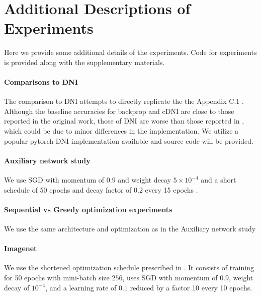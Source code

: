 \documentclass{article}
\begin{document}
\setcounter{section}{1}
\section{Additional Descriptions of Experiments}
Here we provide some additional details of the experiments. Code for experiments is provided along with the supplementary materials.
\paragraph{Comparisons to DNI} The comparison to DNI attempts to directly replicate the the Appendix C.1 \citep{jaderberg2016decoupled}. Although the baseline accuracies for backprop and cDNI are close to those reported in the original work, those of DNI are worse than those reported in \citep{jaderberg2016decoupled}, which could be due to minor differences in the implementation. We utilize a popular pytorch DNI implementation available and source code will be provided.

\paragraph{Auxiliary network study} We use SGD with momentum of $0.9$ and weight decay $5\times 10^{-4}$  \citep{zagoruyko2016wide} and a short schedule of 50 epochs and decay factor of $0.2$ every 15 epochs \citep{shallow}. 
\paragraph{Sequential vs Greedy optimization experiments} We use the same architecture and optimization as in the Auxiliary network study

\paragraph{Imagenet} We use the shortened optimization schedule prescribed in \citep{Xiao2019}. It consists of training for 50 epochs with mini-batch size $256$, uses SGD with momentum of 0.9,  weight decay of $10^{-4}$, and a learning rate of $0.1$ reduced by a factor 10 every 10 epochs.
\end{document}
